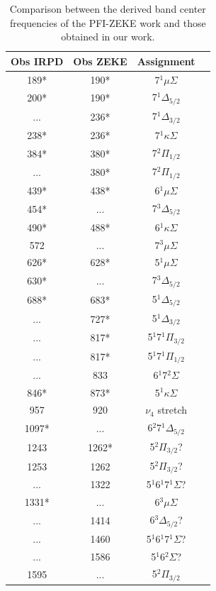 \begin{table}[!htb]
\centering
\caption{ Comparison between the derived band center frequencies of the PFI-ZEKE work \cite{Dai2015TheCalculations} and those obtained in our work.}\label{tab:bend-freq-dai}

    \begin{threeparttable}

    \begin{tabular}{c c c c}
     \hline\hline 
     Obs IRPD & Obs ZEKE & Assignment  \\
     \hline
     189* & 190* & 7$^1\mu\Sigma$\\
     200* & 190* & 7$^1\Delta_{5/2}$ \\
     ... & 236* & 7$^1\Delta_{3/2}$ \\
     238* & 236* & 7$^1\kappa\Sigma$ \\
     384* & 380* & 7$^2\Pi_{1/2}$ \\
     ... & 380* & 7$^2\Pi_{1/2}$ \\
     439* & 438* & 6$^1\mu\Sigma$ \\
     454* & ... & 7$^3\Delta_{5/2}$\\ 
     490* & 488* & 6$^1\kappa\Sigma$ \\
     572 & ... & 7$^3\mu\Sigma$ \\
     626* & 628* & 5$^1\mu\Sigma$ \\
     630* & ... & 7$^3\Delta_{5/2}$ \\
     688* & 683* & 5$^1\Delta_{5/2}$ \\
     ... & 727* & 5$^1\Delta_{3/2}$ \\
     ... & 817* & 5$^1$7$^1\Pi_{3/2}$ \\
     ... & 817* & 5$^1$7$^1\Pi_{1/2}$ \\ 
     ... & 833 & 6$^1$7$^2\Sigma$\\
     846* & 873* & 5$^1\kappa\Sigma$\\
     957 & 920 & $\nu_4$ stretch\\
     1097* & ...  & 6$^2$7$^1\Delta_{5/2}$\\
     1243 & 1262* & 5$^2\Pi_{3/2}$? \\
     1253 & 1262 & 5$^2\Pi_{3/2}$? \\
     ...  & 1322 & 5$^1$6$^1$7$^1\Sigma$?\\
     1331* & ...  & 6$^3\mu\Sigma$\\
     ...  & 1414 & 6$^3\Delta_{5/2}$?\\
     ...  & 1460 & 5$^1$6$^1$7$^1\Sigma$?\\
     ...  & 1586 & 5$^1$6$^2\Sigma$?\\
     1595 & ...  & 5$^2\Pi_{3/2}$\\
    \hline\hline 
 \end{tabular}
 

\end{threeparttable}
\end{table}
